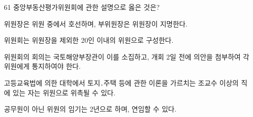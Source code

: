 \begin{question}{61}
중앙부동산평가위원회에 관한 설명으로 옳은 것은?
\begin{choices}
  \item 위원장은 위원 중에서 호선하며, 부위원장은 위원장이 지명한다.
  \item 위원회는 위원장을 제외한 20인 이내의 위원으로 구성한다.
  \item 위원회의 회의는 국토해양부장관이 이를 소집하고, 개회 2일 전에 의안을 첨부하여 각 위원에게 통지하여야 한다.
  \item 고등교육법에 의한 대학에서 토지․주택 등에 관한 이론을 가르치는 조교수 이상의 직에 있는 자는 위원으로 위촉될 수 있다.
  \item 공무원이 아닌 위원의 임기는 2년으로 하며, 연임할 수 있다.
\end{choices}
\end{question}
